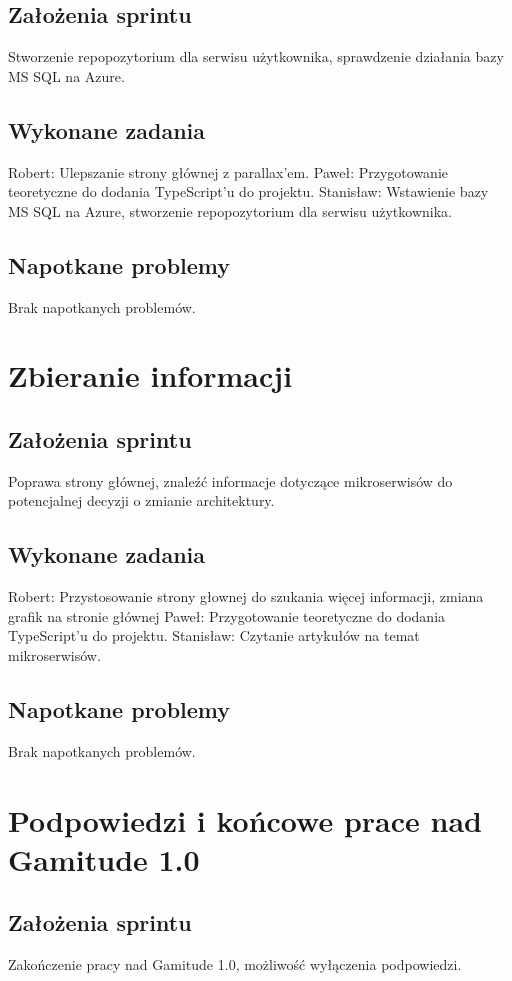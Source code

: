 \documentclass[a4paper,11pt]{report}
\begin{document}
\subsection {Założenia sprintu}
Stworzenie repopozytorium dla serwisu użytkownika, sprawdzenie działania bazy MS SQL na Azure.
\subsection {Wykonane zadania}
Robert: Ulepszanie strony głównej z parallax'em.
Paweł: Przygotowanie teoretyczne do dodania TypeScript'u do projektu.
Stanisław: Wstawienie bazy MS SQL na Azure, stworzenie repopozytorium dla serwisu użytkownika.  
\subsection {Napotkane problemy}
Brak napotkanych problemów.

\section {Zbieranie informacji}
\subsection {Założenia sprintu}
Poprawa strony głównej, znaleźć informacje dotyczące mikroserwisów do potencjalnej decyzji o zmianie architektury.
\subsection {Wykonane zadania}
Robert: Przystosowanie strony głownej do szukania więcej informacji, zmiana grafik na stronie głównej 
Paweł: Przygotowanie teoretyczne do dodania TypeScript'u do projektu. 
Stanisław: Czytanie artykułów na temat mikroserwisów.
\subsection {Napotkane problemy}
Brak napotkanych problemów.

\section {Podpowiedzi i końcowe prace nad Gamitude 1.0}
\subsection {Założenia sprintu}
Zakończenie pracy nad Gamitude 1.0, możliwość wyłączenia podpowiedzi.
\end{document}

